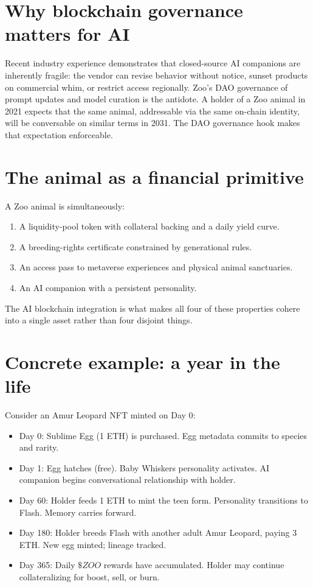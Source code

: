 \documentclass[11pt,letterpaper]{article}
\begin{document}
\section{Why blockchain governance matters for AI}

Recent industry experience demonstrates that closed-source AI companions are inherently fragile: the vendor can revise behavior without notice, sunset products on commercial whim, or restrict access regionally. Zoo's DAO governance of prompt updates and model curation is the antidote. A holder of a Zoo animal in 2021 expects that the same animal, addressable via the same on-chain identity, will be conversable on similar terms in 2031. The DAO governance hook makes that expectation enforceable.

\section{The animal as a financial primitive}

A Zoo animal is simultaneously:

\begin{enumerate}
  \item A liquidity-pool token with collateral backing and a daily yield curve.
  \item A breeding-rights certificate constrained by generational rules.
  \item An access pass to metaverse experiences and physical animal sanctuaries.
  \item An AI companion with a persistent personality.
\end{enumerate}

The AI \texttimes{} blockchain integration is what makes all four of these properties cohere into a single asset rather than four disjoint things.

\section{Concrete example: a year in the life}

Consider an Amur Leopard NFT minted on Day 0:

\begin{itemize}
  \item Day 0: Sublime Egg (1 ETH) is purchased. Egg metadata commits to species and rarity.
  \item Day 1: Egg hatches (free). Baby Whiskers personality activates. AI companion begins conversational relationship with holder.
  \item Day 60: Holder feeds 1 ETH to mint the teen form. Personality transitions to Flash. Memory carries forward.
  \item Day 180: Holder breeds Flash with another adult Amur Leopard, paying 3 ETH. New egg minted; lineage tracked.
  \item Day 365: Daily $\$ZOO$ rewards have accumulated. Holder may continue collateralizing for boost, sell, or burn.
\end{itemize}
\end{document}
